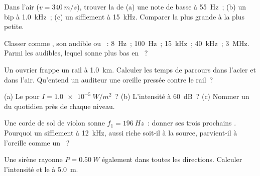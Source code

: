 \begin{exercise}[$\star$]\label{exo:g12:sound-acoustics:1}
Dans l'air ($v = \qty{340}{m/s}$), trouver la
 de (a) une note de basse à \qty{55}{Hz}~;
(b) un bip à \qty{1.0}{kHz}~; (c) un sifflement à \qty{15}{kHz}.
Comparer la plus grande à la plus petite.
\end{exercise}

\begin{exercise}[$\star$]\label{exo:g12:sound-acoustics:2}
Classer comme , son audible ou
~: \qty{8}{Hz}~; \qty{100}{Hz}~; \qty{15}{kHz}~;
\qty{40}{kHz}~; \qty{3}{MHz}. Parmi les audibles, lequel
sonne plus bas en ~?
\end{exercise}

\begin{exercise}[$\star$]\label{exo:g12:sound-acoustics:3}
Un ouvrier frappe un rail à \qty{1.0}{km}. Calculer les temps de
parcours dans l'acier et dans l'air. Qu'entend un auditeur une oreille
pressée contre le rail~?
\end{exercise}

\begin{exercise}[$\star$]\label{exo:g12:sound-acoustics:4}
(a) Le  pour $I = \qty{1.0e-5}{W/m^2}$~? (b)
L'intensité à \qty{60}{dB}~? (c) Nommer un  du quotidien près
de chaque niveau.
\end{exercise}

\begin{exercise}[$\star$]\label{exo:g12:sound-acoustics:5}
Une corde de sol de violon sonne $f_1 = \qty{196}{Hz}$~: donner
ses trois prochains . Pourquoi un sifflement à
\qty{12}{kHz}, aussi riche soit-il à la source, parvient-il à
l'oreille comme un ~?
\end{exercise}

\begin{exercise}[$\star\star$]\label{exo:g12:sound-acoustics:6}
Une sirène rayonne $P = \qty{0.50}{W}$ également dans toutes les
directions. Calculer l'intensité et le  à
\qty{5.0}{m}.
\end{exercise}

